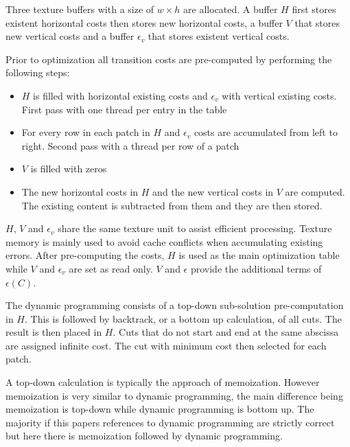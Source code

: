 \documentclass{acmsmall}
\begin{document}
Three texture buffers with a size of $w \times h$ are allocated. A buffer $H$ first stores existent horizontal costs then stores new horizontal costs, a buffer $V$ that stores new vertical costs and a buffer $\epsilon_v$ that stores existent vertical costs.

Prior to optimization all transition costs are pre-computed by performing the following steps:
\begin{itemize}
\item $H$ is filled with horizontal existing costs and $\epsilon_v$ with vertical existing costs. First pass with one thread per entry in the table
\item For every row in each patch in $H$ and $\epsilon_v$ costs are accumulated from left to right. Second pass with a thread per row of a patch
\item $V$ is filled with zeros
\item The new horizontal costs in $H$ and the new vertical costs in $V$ are computed. The existing content is subtracted from them and they are then stored.
\end{itemize}
$H$, $V$ and $\epsilon_v$ share the same texture unit to assist efficient processing. Texture memory is mainly used to avoid cache conflicts when accumulating existing errors. After pre-computing the costs, $H$ is used as the main optimization table while $V$ and $\epsilon_v$ are set as read only. $V$ and $\epsilon$ provide the additional terms of $\epsilon(C)$.

The dynamic programming consists of a top-down sub-solution pre-computation in $H$. This is followed by backtrack, or a bottom up calculation, of all cuts. The result is then placed in $H$. Cuts that do not start and end at the same abscissa are assigned infinite cost. The cut with minimum cost then selected for each patch.

A top-down calculation is typically the approach of memoization. However memoization is very similar to dynamic programming, the main difference being memoization is top-down while dynamic programming is bottom up. The majority if this papers references to dynamic programming are strictly correct but here there is memoization followed by dynamic programming. 
\end{document}
